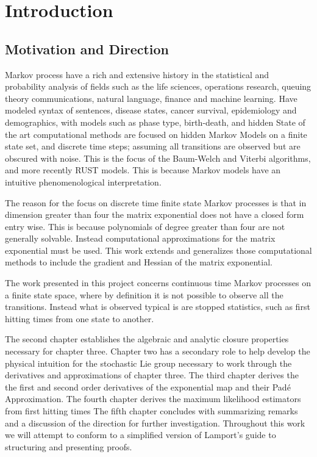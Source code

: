 \chapter{Introduction}
\section{Motivation and Direction}
Markov process have a rich and extensive history in the statistical and 
probability analysis of fields such as the life sciences, operations research,
queuing theory communications, natural language, finance and machine learning.
Have modeled syntax of sentences, disease states, cancer survival, epidemiology
and demographics, with models such as phase type, birth-death, and hidden
State of the art computational methods are focused on hidden Markov Models on
a finite state set, and discrete time steps; assuming all transitions are
observed but are obscured with noise. This is the focus of the Baum-Welch and
Viterbi algorithms, and more recently RUST models. This is because Markov models
have an intuitive phenomenological interpretation.

The reason for the focus on discrete time finite state Markov processes is that
in dimension greater than four the matrix exponential does not have a closed form
entry wise. This is because polynomials of degree greater than four are not
generally solvable. Instead computational approximations for the matrix
exponential must be used. This work extends and generalizes those computational
methods to include the gradient and Hessian of the matrix exponential.

The work presented in this project concerns continuous time Markov processes on
a finite state space, where by definition it is not possible to observe all the
transitions. Instead what is observed typical is are stopped statistics, such
as first hitting times from one state to another.

The second chapter establishes the algebraic and analytic closure properties
necessary for chapter three. Chapter two has a secondary role to help develop the 
physical intuition for the stochastic Lie group necessary to work through the 
derivatives and approximations of chapter three.
The third chapter derives the the first and second order derivatives of the exponential
map and their Pad\'{e} Approximation.
The fourth chapter derives the maximum likelihood estimators from first hitting times
The fifth chapter concludes with summarizing remarks and a discussion of the direction
for further investigation.
Throughout this work we will attempt to conform to a simplified version of 
Lamport's guide to structuring and presenting proofs.

